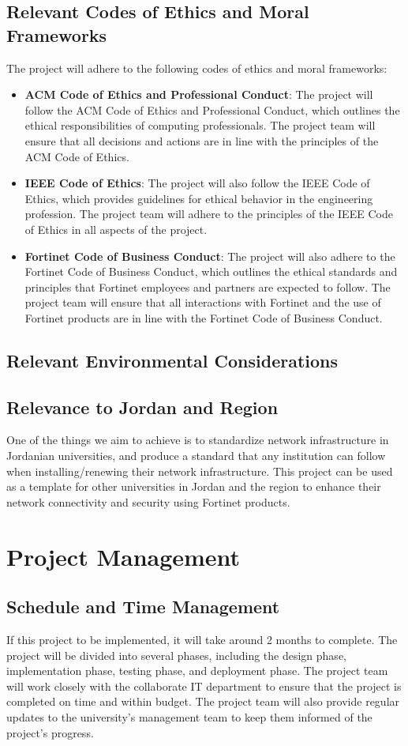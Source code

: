 \documentclass[12pt]{report}
\begin{document}
\section{Relevant Codes of Ethics and Moral Frameworks}
The project will adhere to the following codes of ethics and moral frameworks:
\begin{itemize}
    \item \textbf{ACM Code of Ethics and Professional Conduct}: The project will follow the ACM Code of Ethics and Professional Conduct, which outlines the ethical responsibilities of computing professionals. The project team will ensure that all decisions and actions are in line with the principles of the ACM Code of Ethics.
    \item \textbf{IEEE Code of Ethics}: The project will also follow the IEEE Code of Ethics, which provides guidelines for ethical behavior in the engineering profession. The project team will adhere to the principles of the IEEE Code of Ethics in all aspects of the project.
    \item \textbf{Fortinet Code of Business Conduct}: The project will also adhere to the Fortinet Code of Business Conduct, which outlines the ethical standards and principles that Fortinet employees and partners are expected to follow. The project team will ensure that all interactions with Fortinet and the use of Fortinet products are in line with the Fortinet Code of Business Conduct.
\end{itemize}
\section{Relevant Environmental Considerations}

\section{Relevance to Jordan and Region}
One of the things we aim to achieve is to standardize network infrastructure in Jordanian universities, and produce a standard that any institution can follow when installing/renewing their network infrastructure. This project can be used as a template for other universities in Jordan and the region to enhance their network connectivity and security using Fortinet products.
\chapter{Project Management}
\section{Schedule and Time Management}
If this project to be implemented, it will take around 2 months to complete. The project will be divided into several phases, including the design phase, implementation phase, testing phase, and deployment phase. The project team will work closely with the collaborate IT department to ensure that the project is completed on time and within budget. The project team will also provide regular updates to the university's management team to keep them informed of the project's progress.
\end{document}
